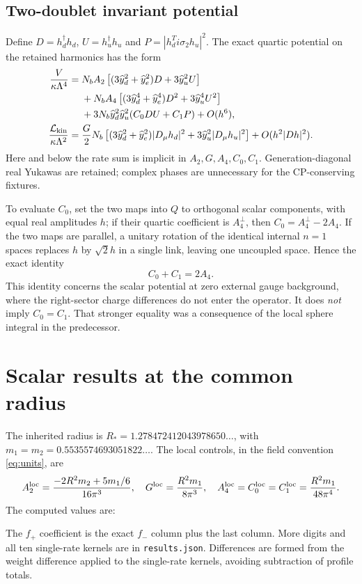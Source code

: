 \documentclass[11pt,letterpaper]{article}
\begin{document}
\subsection{Two-doublet invariant potential}

Define $D=h_d^\dagger h_d$, $U=h_u^\dagger h_u$ and $P=|h_d^Ti\sigma_2h_u|^2$. The exact quartic potential on the retained harmonics has the form
\begin{align}
 \frac{V}{\kappa\Lambda^4}={}&N_bA_2\left[(3\widehat y_d^2+\widehat y_e^2)D+3\widehat y_u^2U\right]\nonumber\\
 &+N_bA_4\left[(3\widehat y_d^4+\widehat y_e^4)D^2+3\widehat y_u^4U^2\right]\nonumber\\
 &+3N_b\widehat y_d^2\widehat y_u^2(C_0DU+C_1P)+O(h^6),\label{eq:2HDM}\\
 \frac{\mathcal L_{\rm kin}}{\kappa\Lambda^2}={}&\frac G2N_b\left[(3\widehat y_d^2+\widehat y_e^2)|D_\mu h_d|^2+
                  3\widehat y_u^2|D_\mu h_u|^2\right]+O(h^2|D h|^2).
 \label{eq:kinH}
\end{align}
Here and below the rate sum is implicit in $A_2,G,A_4,C_0,C_1$. Generation-diagonal real Yukawas are retained; complex phases are unnecessary for the CP-conserving fixtures.

To evaluate $C_0$, set the two maps into $Q$ to orthogonal scalar components, with equal real amplitudes $h$; if their quartic coefficient is $A_4^{\perp}$, then $C_0=A_4^{\perp}-2A_4$. If the two maps are parallel, a unitary rotation of the identical internal $n=1$ spaces replaces $h$ by $\sqrt2h$ in a single link, leaving one uncoupled space. Hence the exact identity
\begin{equation}
 C_0+C_1=2A_4.\label{eq:quarticidentity}
\end{equation}
This identity concerns the scalar potential at zero external gauge background, where the right-sector charge differences do not enter the operator. It does \emph{not} imply $C_0=C_1$. That stronger equality was a consequence of the local sphere integral in the predecessor.

\section{Scalar results at the common radius}

The inherited radius is $R_*=1.278472412043978650\ldots$, with $m_1=m_2=0.5535574693051822\ldots$. The local controls, in the field convention \eqref{eq:units}, are
\begin{equation}
 A_2^{\rm loc}=\frac{-2R^2m_2+5m_1/6}{16\pi^3},\quad
 G^{\rm loc}=\frac{R^2m_1}{8\pi^3},\quad
 A_4^{\rm loc}=C_0^{\rm loc}=C_1^{\rm loc}=\frac{R^2m_1}{48\pi^4}.
 \label{eq:local}
\end{equation}
The computed values are:
\begin{center}\footnotesize\ScalarTable\end{center}
The $f_+$ coefficient is the exact $f_-$ column plus the last column. More digits and all ten single-rate kernels are in \texttt{results.json}. Differences are formed from the weight difference applied to the single-rate kernels, avoiding subtraction of profile totals.
\end{document}
